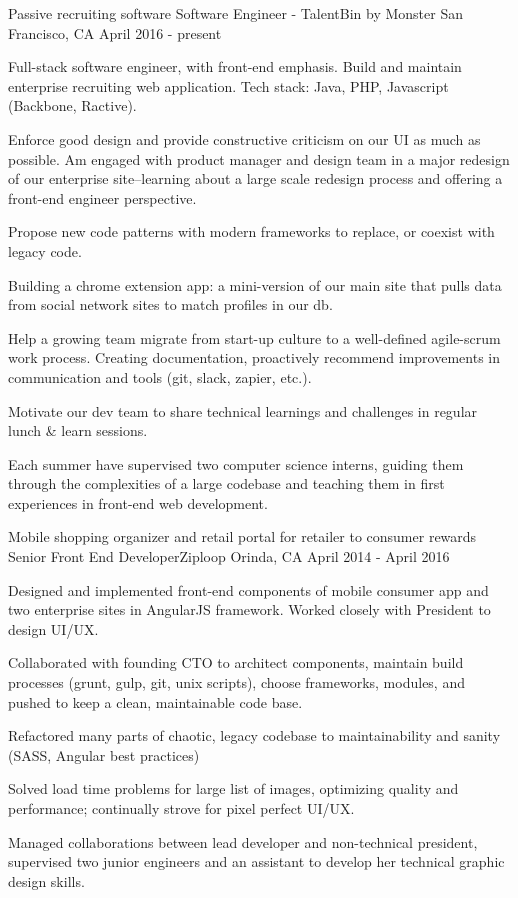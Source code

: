 \begin{cventries}
  \cventry
    {Passive recruiting software}
    {Software Engineer - TalentBin by Monster}    
    {San Francisco, CA}
    {April 2016 - present}
    {
      \begin{cvitems}
        \item {Full-stack software engineer, with front-end emphasis. Build and maintain enterprise recruiting web application. Tech stack: Java, PHP, Javascript (Backbone, Ractive).}
        \item {Enforce good design and provide constructive criticism on our UI as much as possible. Am engaged with product manager and design team in a major redesign of our enterprise site--learning about a large scale redesign process and offering a front-end engineer perspective.}
        \item {Propose new code patterns with modern frameworks to replace, or coexist with legacy code.}
        \item {Building a chrome extension app: a mini-version of our main site that pulls data from social network sites to match profiles in our db.}
        \item {Help a growing team migrate from start-up culture to a well-defined agile-scrum work process. Creating documentation, proactively recommend improvements in communication and tools (git, slack, zapier, etc.).}
        \item {Motivate our dev team to share technical learnings and challenges in regular lunch \& learn sessions.}
        \item {Each summer have supervised two computer science interns, guiding them through the complexities of a large codebase and teaching them in first experiences in front-end web development.}
      \end{cvitems}
    }
    
  \cventry
    {Mobile shopping organizer and retail portal for retailer to consumer rewards}
    {Senior Front End Developer{\enskip\cdotp\enskip}Ziploop }
    {Orinda, CA}
    {April 2014 - April 2016}
    {
      \begin{cvitems}
        \item {Designed and implemented front-end components of mobile consumer app and two enterprise sites in AngularJS framework. Worked closely with President to design UI/UX.}
        \item {Collaborated with founding CTO to architect components, maintain build processes (grunt, gulp, git, unix scripts), choose frameworks, modules, and pushed to keep a clean, maintainable code base.}
        \item {Refactored many parts of chaotic, legacy codebase to maintainability and sanity (SASS, Angular best practices)
        \item Solved load time problems for large list of images, optimizing quality and performance; continually strove for pixel perfect UI/UX.}
        \item {Managed collaborations between lead developer and non-technical president, supervised two junior engineers and an assistant to develop her technical graphic design skills.}
      \end{cvitems}
    }
 

\end{cventries}
